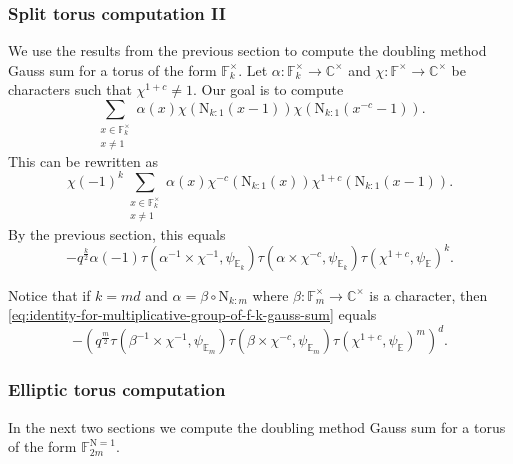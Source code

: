 \documentclass[12pt, reqno]{amsart}
\theoremstyle{definition}
\theoremstyle{definition}
\theoremstyle{definition}
\newcommand{\cComplex}{\mathbb{C}}
\newcommand{\multiplicativegroup}[1]{#1^{\times}}
\newcommand{\fieldCharacter}{\psi}
\newcommand{\minusInvolution}[1]{#1^{-c}}
\newcommand{\involutionPlusOne}[1]{#1^{1+c}}
\newcommand{\FieldNorm}[2]{\mathrm{N}_{#1:#2}}
\newcommand{\aFieldNorm}{\mathrm{N}}
\newcommand{\finiteField}{\mathbb{F}}
\newcommand{\quadraticExtension}{\mathbb{E}}
\newcommand{\finiteFieldExtension}[1]{\finiteField_{#1}}
\newcommand{\quadraticFieldExtension}[1]{\quadraticExtension_{#1}}
\newcommand{\NormOneGroup}[1]{\finiteFieldExtension{#1}^{\aFieldNorm = 1}}
\newcommand{\GaussSumCharacter}[3]{\tau\left(#1 \times #2, #3\right)}
\begin{document}
\subsubsection{Split torus computation II}
We use the results from the previous section to compute the doubling method Gauss sum for a torus of the form $\multiplicativegroup{\finiteFieldExtension{k}}$. Let $\alpha \colon \multiplicativegroup{\finiteFieldExtension{k}} \to \multiplicativegroup{\cComplex}$ and $\chi \colon \multiplicativegroup{\finiteField} \to \multiplicativegroup{\cComplex}$ be characters such that $\involutionPlusOne{\chi} \ne 1$. Our goal is to compute $$\sum_{\substack{x \in \multiplicativegroup{\finiteFieldExtension{k}}\\
		x \ne 1}} \alpha \left(x\right) \chi\left(\FieldNorm{k}{1}\left(x - 1\right)\right) \chi\left(\FieldNorm{k}{1}\left(\minusInvolution{x} - 1\right)\right).$$
This can be rewritten as
$$\chi\left(-1\right)^k \sum_{\substack{x \in \multiplicativegroup{\finiteFieldExtension{k}}\\
		x \ne 1}} \alpha \left(x\right) \minusInvolution{\chi}\left(\FieldNorm{k}{1}\left(x\right)\right) \involutionPlusOne{\chi}\left(\FieldNorm{k}{1}\left(x - 1\right)\right).$$
By the previous section, this equals
\begin{equation}\label{eq:identity-for-multiplicative-group-of-f-k-gauss-sum}
	-q^{\frac{k}{2}} \alpha\left(-1\right)  \GaussSumCharacter{\alpha^{-1}}{\chi^{-1}}{\fieldCharacter_{\quadraticFieldExtension{k}}} \GaussSumCharacter{\alpha}{\minusInvolution{\chi}}{\fieldCharacter_{\quadraticFieldExtension{k}}} \tau\left(\involutionPlusOne{\chi}, \fieldCharacter_{\quadraticExtension}\right)^k.
\end{equation}

Notice that if $k = md$ and $\alpha = \beta \circ \FieldNorm{k}{m}$ where $\beta \colon \multiplicativegroup{\finiteFieldExtension{m}} \to \multiplicativegroup{\cComplex}$ is a character, then \eqref{eq:identity-for-multiplicative-group-of-f-k-gauss-sum} equals
$$-\left(q^{\frac{m}{2}} \GaussSumCharacter{\beta^{-1}}{\chi^{-1}}{\fieldCharacter_{\quadraticFieldExtension{m}}} \GaussSumCharacter{\beta}{\minusInvolution{\chi}}{\fieldCharacter_{\quadraticFieldExtension{m}}} \tau\left(\involutionPlusOne{\chi}, \fieldCharacter_{\quadraticExtension}\right)^m\right)^{d}.$$

\subsubsection{Elliptic torus computation}
In the next two sections we compute the doubling method Gauss sum for a torus of the form $\NormOneGroup{2m}$.
\end{document}
